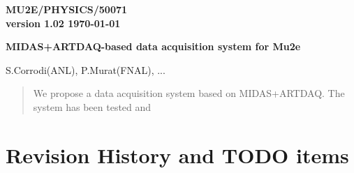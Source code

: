 \documentclass[12pt]{article}
\begin{document}
\begin{titlepage}
  \begin{flushright}
    \bf {MU2E/PHYSICS/50071} \\
    version 1.02
    \today
 \end{flushright}

  \vspace{1cm}

  \begin{center}
    {\Large \bf MIDAS+ARTDAQ-based data acquisition system for Mu2e
      \vspace{0.3in}
    }

    \vspace{1cm}
    S.Corrodi(ANL), P.Murat(FNAL), ...

    \vspace{0.3cm}

    \vspace{0.8cm}
  \end{center}

  \begin{abstract}
    \vspace{0.2in}
    
    We propose a data acquisition system based on MIDAS+ARTDAQ. 
    The system has been tested and 
  \end{abstract}

\end{titlepage}
%
%
%
{\tableofcontents}

% 


\newpage
\section {Revision History and TODO items}
\end{document}
